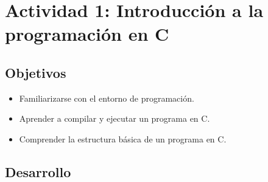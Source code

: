 \section{Actividad 1: Introducción a la programación en C}
\subsection{Objetivos}
\begin{itemize}
    \item Familiarizarse con el entorno de programación.
    \item Aprender a compilar y ejecutar un programa en C.
    \item Comprender la estructura básica de un programa en C.
\end{itemize}
\subsection{Desarrollo}

